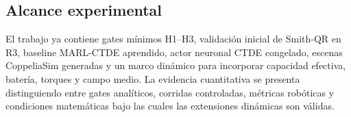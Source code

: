 \subsection{Alcance experimental}

El trabajo ya contiene gates mínimos H1--H3, validación inicial de Smith-QR en R3,
baseline MARL-CTDE aprendido, actor neuronal CTDE congelado, escenas CoppeliaSim generadas y un marco dinámico para incorporar
capacidad efectiva, batería, torques y campo medio. La evidencia cuantitativa se
presenta distinguiendo entre gates analíticos, corridas controladas, métricas robóticas
y condiciones matemáticas bajo las cuales las extensiones dinámicas son válidas.
